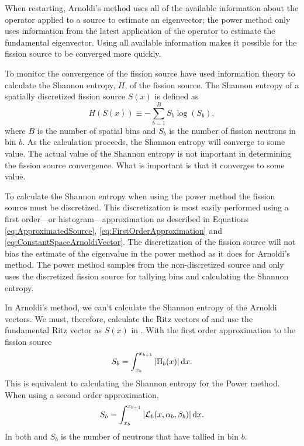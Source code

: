 When restarting, Arnoldi's method uses all of the available information about the operator applied to a source to estimate an eigenvector; the power method only uses information from the latest application of the operator to estimate the fundamental eigenvector.  Using all available information makes it possible for the fission source to be converged more quickly.  

To monitor the convergence of the fission source \citet{Ueki:2003Infor-0} have used information theory to calculate the Shannon entropy, $H$, of the fission source.   The Shannon entropy of a spatially discretized fission source $S(x)$ is defined as
\begin{equation}
    H(S(x)) \equiv -\sum_{b=1}^B S_b\log(S_b),
    \label{eq:ShannonEntropy}
\end{equation}
where $B$ is the number of spatial bins and $S_b$ is the number of fission neutrons in bin $b$.  As the calculation proceeds, the Shannon entropy will converge to some value.  The actual value of the Shannon entropy is not important in determining the fission source convergence.  What is important is that it converges to some value.

To calculate the Shannon entropy when using the power method the fission source must be discretized.  This discretization is most easily performed using a first order---or histogram---approximation as described in Equations \eqref{eq:ApproximatedSource}, \eqref{eq:FirstOrderApproximation} and \eqref{eq:ConstantSpaceArnoldiVector}.  The discretization of the fission source will not bias the estimate of the eigenvalue in the power method as it does for Arnoldi's method.  The power method samples from the non-discretized source and only uses the discretized fission source for tallying bins and calculating the Shannon entropy.

In Arnoldi's method, we can't calculate the Shannon entropy of the Arnoldi vectors.  We must, therefore, calculate the Ritz vectors of \A{} and use the fundamental Ritz vector as $S(x)$ in .  With the first order approximation to the fission source 
\begin{equation}
	S_b = \int_{x_b}^{x_{b+1}} \left|\Pi_b(x)\right| \mathop{}\!\mathrm{d} x.
	\label{eq:SbFirstOrder}
\end{equation}
This is equivalent to calculating the Shannon entropy for the Power method.  When using a second order approximation, 
\begin{equation}
	S_b = \int_{x_b}^{x_{b+1}} \left|\mathcal{L}_b(x, \alpha_b, \beta_b)\right| \mathop{}\!\mathrm{d} x.
	\label{eq:SbSecondOrder}
\end{equation}
In both  and  $S_b$ is the number of neutrons that have tallied in bin $b$.


